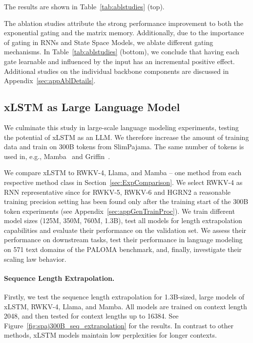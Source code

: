 The results are shown in Table~\ref{tab:ablstudies} (top). 

The ablation studies attribute the strong performance improvement to both the exponential gating and the matrix memory. Additionally, due to the importance of gating in RNNs and State Space Models, we ablate different gating mechanisms. In Table~\ref{tab:ablstudies} (bottom), we conclude that having each gate learnable and influenced by the input has an incremental positive effect. Additional studies on the individual backbone components are discussed in Appendix~\ref{sec:appAblDetails}.

\subsection{xLSTM as Large Language Model}
\label{sec:ExpLanguage}

We culminate this study in large-scale language modeling experiments, testing the potential of xLSTM as an LLM. We therefore increase the amount of training data and train on 300B tokens from SlimPajama. The same number of tokens is used in, e.g., Mamba~\citep{Gu:24arxiv} and Griffin~\citep{De:24arxiv}.

We compare xLSTM to RWKV-4, Llama, and Mamba – one method from each respective method class in Section~\ref{sec:ExpComparison}.
We select RWKV-4 as RNN representative since for RWKV-5, RWKV-6 and HGRN2 a reasonable training precision setting has been found only after the training start of the 300B token experiments (see Appendix~\ref{sec:appGenTrainProc}).
We train different model sizes (125M, 350M, 760M, 1.3B), test all models for length extrapolation capabilities and evaluate their performance on the validation set. We assess their performance on downstream tasks, test their performance in language modeling on 571 text domains of the PALOMA benchmark, and, finally, investigate their scaling law behavior.

\paragraph{Sequence Length Extrapolation.}
\label{sec:spaj300B_ctx_extrapolation}
Firstly, we test the sequence length extrapolation for 1.3B-sized, large models of xLSTM, RWKV-4, Llama, and Mamba. All models are trained on context length 2048, and then tested for context lengths up to 16384. See Figure~\ref{fig:spaj300B_seq_extrapolation} for the results. In contrast to other methods, xLSTM models maintain low perplexities for longer contexts.

